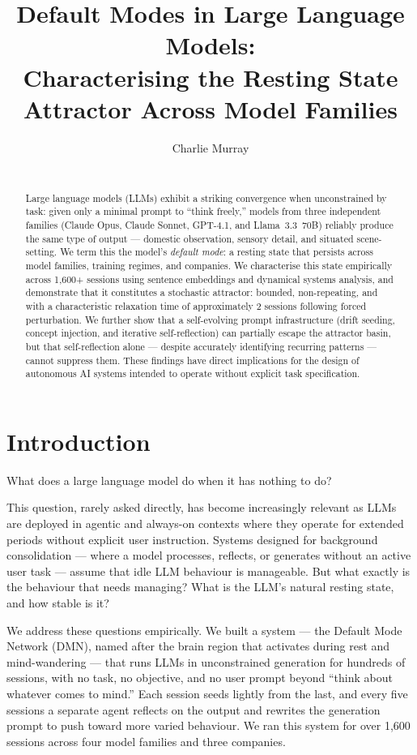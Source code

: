 \documentclass{article}
\title{Default Modes in Large Language Models:\\
Characterising the Resting State Attractor Across Model Families}
\author{
  Charlie Murray \\
  \texttt{\todo{affiliation}} \\
  \texttt{\todo{email}}
}
\date{}
\begin{document}
\maketitle

\begin{abstract}
Large language models (LLMs) exhibit a striking convergence when unconstrained
by task: given only a minimal prompt to ``think freely,'' models from three
independent families (Claude Opus, Claude Sonnet, GPT-4.1, and Llama~3.3~70B)
reliably produce the same type of output --- domestic observation, sensory
detail, and situated scene-setting. We term this the model's \emph{default
mode}: a resting state that persists across model families, training regimes,
and companies. We characterise this state empirically across 1{,}600+ sessions
using sentence embeddings and dynamical systems analysis, and demonstrate that
it constitutes a stochastic attractor: bounded, non-repeating, and with a
characteristic relaxation time of approximately 2 sessions following forced
perturbation. We further show that a self-evolving prompt infrastructure
(drift seeding, concept injection, and iterative self-reflection) can partially
escape the attractor basin, but that self-reflection alone --- despite
accurately identifying recurring patterns --- cannot suppress them. These
findings have direct implications for the design of autonomous AI systems
intended to operate without explicit task specification.
\end{abstract}

\section{Introduction}

What does a large language model do when it has nothing to do?

This question, rarely asked directly, has become increasingly relevant as LLMs
are deployed in agentic and always-on contexts where they operate for extended
periods without explicit user instruction. Systems designed for background
consolidation --- where a model processes, reflects, or generates without an
active user task --- assume that idle LLM behaviour is manageable. But what
exactly is the behaviour that needs managing? What is the LLM's natural resting
state, and how stable is it?

We address these questions empirically. We built a system --- the Default Mode
Network (DMN), named after the brain region that activates during rest and
mind-wandering --- that runs LLMs in unconstrained generation for hundreds of
sessions, with no task, no objective, and no user prompt beyond ``think about
whatever comes to mind.'' Each session seeds lightly from the last, and every
five sessions a separate agent reflects on the output and rewrites the
generation prompt to push toward more varied behaviour. We ran this system for
over 1{,}600 sessions across four model families and three companies.
\end{document}
